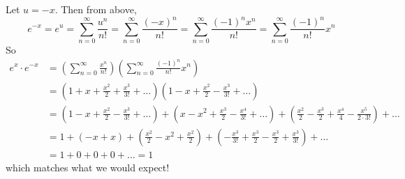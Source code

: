 \documentclass[12pt]{article}
\begin{document}
\begin{enumerate}
        \color{blue}
            Let $u = -x$. Then from above,
            \[e^{-x} = e^u = \sum_{n=0}^{\infty} \frac{u^n}{n!} = \sum_{n=0}^{\infty} \frac{(-x)^n}{n!} = \sum_{n=0}^{\infty} \frac{(-1)^nx^n}{n!} = \sum_{n=0}^{\infty} \frac{(-1)^n}{n!}x^n\]
            So 
            \begin{align*}
                e^x \cdot e^{-x} &= \left(\sum_{n=0}^{\infty} \frac{x^n}{n!}\right)\left(\sum_{n=0}^{\infty} \frac{(-1)^n}{n!}x^n\right)\\
                    &= \left(1 + x + \frac{x^2}{2} + \frac{x^3}{3!} + \dots\right)\left(1 - x + \frac{x^2}{2} - \frac{x^3}{3!} + \dots\right)\\ 
                    &= \left(1 - x + \frac{x^2}{2} - \frac{x^3}{3!} + \dots\right) + \left(x - x^2 + \frac{x^3}{2} - \frac{x^4}{3!} + \dots\right) + \left(\frac{x^2}{2} - \frac{x^3}{2} + \frac{x^4}{4} - \frac{x^5}{2\cdot 3!}\right) + \dots\\ 
                    &= 1 + \left(-x + x\right) + \left(\frac{x^2}{2} - x^2 + \frac{x^2}{2}\right) + \left(-\frac{x^3}{3!} + \frac{x^3}{2} - \frac{x^3}{2} + \frac{x^3}{3!}\right) + \dots\\ 
                    &= 1 + 0 + 0 + 0 + \dots = 1
            \end{align*}
            which matches what we would expect!
        \color{black}

\end{enumerate}
\end{document}
